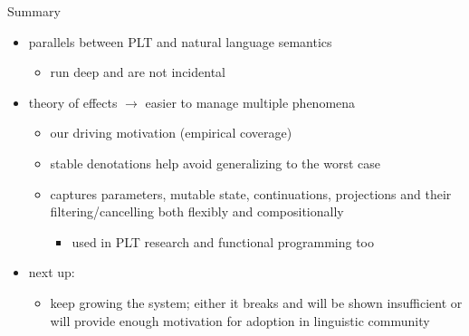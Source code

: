 \documentclass{beamer}
\begin{document}
\begin{frame}{Summary}
  \begin{itemize}
  \item parallels between PLT and natural language semantics
    \begin{itemize}
    \item run deep and are not incidental
    \end{itemize}
   \vfill
   \pause
  \item theory of effects $\rightarrow$ easier to manage multiple phenomena
    \begin{itemize}
    \item our driving motivation (empirical coverage)
    \item stable denotations help avoid generalizing to the worst case
    \item captures parameters, mutable state, continuations, projections
      and their filtering/cancelling both flexibly and compositionally
      \begin{itemize}
      \item used in PLT research and functional programming too
      \end{itemize}
    \end{itemize}
    \vfill
    \pause
    \item next up:
      \begin{itemize}
    \item keep growing the system; either it breaks and will be shown
      insufficient or will provide enough motivation for adoption in
      linguistic community
      \end{itemize}
  \end{itemize}
\end{frame}


\appendix
\end{document}
